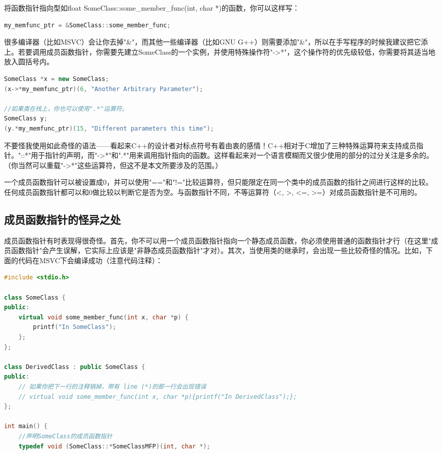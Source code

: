 \documentclass{article}
\begin{document}
\begin{CJK}{UTF8}{gbsn}
将函数指针指向型如float SomeClass::some\_member\_func(int, char *)的函数，你可以这样写：
\begin{lstlisting}[language=c++]
my_memfunc_ptr = &SomeClass::some_member_func;
\end{lstlisting}
很多编译器（比如MSVC）会让你去掉"\&"，而其他一些编译器（比如GNU G++）则需要添加"\&"，所以在手写程序的时候我建议把它添上。若要调用成员函数指针，你需要先建立SomeClass的一个实例，并使用特殊操作符"->*"，这个操作符的优先级较低，你需要将其适当地放入圆括号内。
\begin{lstlisting}[language=c++]
SomeClass *x = new SomeClass;
(x->*my_memfunc_ptr)(6, "Another Arbitrary Parameter");

//如果类在栈上，你也可以使用".*"运算符。
SomeClass y;
(y.*my_memfunc_ptr)(15, "Different parameters this time");
\end{lstlisting}
不要怪我使用如此奇怪的语法——看起来C++的设计者对标点符号有着由衷的感情！C++相对于C增加了三种特殊运算符来支持成员指针。"::*"用于指针的声明，而"->*"和".*"用来调用指针指向的函数。这样看起来对一个语言模糊而又很少使用的部分的过分关注是多余的。（你当然可以重载"->*"这些运算符，但这不是本文所要涉及的范围。）

一个成员函数指针可以被设置成0，并可以使用"=="和"!="比较运算符，但只能限定在同一个类中的成员函数的指针之间进行这样的比较。任何成员函数指针都可以和0做比较以判断它是否为空。与函数指针不同，不等运算符（<, >, <=, >=）对成员函数指针是不可用的。

\subsection{成员函数指针的怪异之处}
成员函数指针有时表现得很奇怪。首先，你不可以用一个成员函数指针指向一个静态成员函数，你必须使用普通的函数指针才行（在这里"成员函数指针"会产生误解，它实际上应该是"非静态成员函数指针"才对）。其次，当使用类的继承时，会出现一些比较奇怪的情况。比如，下面的代码在MSVC下会编译成功（注意代码注释）：
\begin{lstlisting}[language=c++]
#include <stdio.h>

class SomeClass {
public: 
    virtual void some_member_func(int x, char *p) {
        printf("In SomeClass");
    };
};

class DerivedClass : public SomeClass {
public:
    // 如果你把下一行的注释销掉，带有 line (*)的那一行会出现错误
    // virtual void some_member_func(int x, char *p){printf("In DerivedClass");};
};

int main() {
    //声明SomeClass的成员函数指针
    typedef void (SomeClass::*SomeClassMFP)(int, char *);
    

\end{lstlisting}
\end{CJK}
\end{document}
